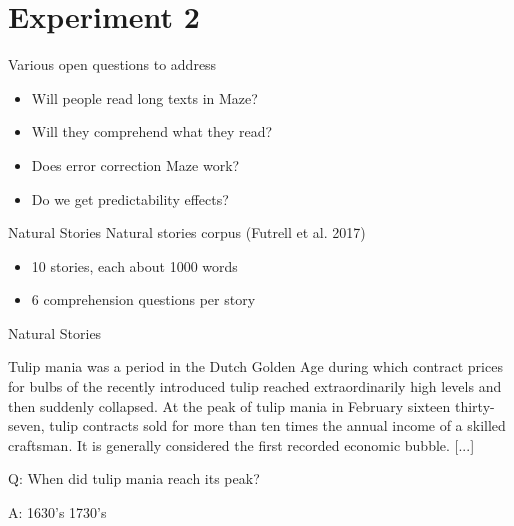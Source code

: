 \documentclass[12pt, xcolor=beamer,table,usenames,dvipsnames, ignorenonframetext, ngerman]{beamer}
\begin{document}
\section{Experiment 2}
\begin{frame}{}
	Various open questions to address \pause
	\begin{itemize}
		\item Will people read long texts in Maze? \pause
		\item Will they comprehend what they read? \pause
		\item Does error correction Maze work? \pause
		\item Do we get predictability effects? 
	\end{itemize}
\end{frame}

\begin{frame}{Natural Stories}
	Natural stories corpus (Futrell et al. 2017) \pause
	\begin{itemize}
		\item 10 stories, each about 1000 words \pause
		\item 6 comprehension questions per story
	\end{itemize}
	
\end{frame}


\begin{frame}{Natural Stories}

\begin{small}Tulip mania was a period in the Dutch Golden Age during which contract prices for bulbs of the recently introduced tulip reached extraordinarily high levels and then suddenly collapsed. At the peak of tulip mania in February sixteen thirty-seven, tulip contracts sold for more than ten times the annual income of a skilled craftsman. It is generally considered the first recorded economic bubble. [...]
\medskip

Q: When did tulip mania reach its peak?

A: \hspace{3em} 1630's\hspace{3em} 1730's \end{small}

\end{frame}
\end{document}
